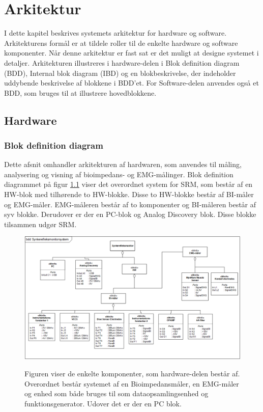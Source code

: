 \chapter{Arkitektur}

I dette kapitel beskrives systemets arkitektur for hardware og software. Arkitekturens formål er at tildele roller til de enkelte hardware og software komponenter. Når denne arkitektur er fast sat er det muligt at designe systemet i detaljer. Arkitekturen illustreres i hardware-delen i Blok definition diagram (BDD), Internal blok diagram (IBD) og en blokbeskrivelse, der indeholder uddybende beskrivelse af blokkene i BDD'et. For Software-delen anvendes også et BDD, som bruges til at illustrere hovedblokkene.

\section{Hardware}
\subsection{Blok definition diagram}

Dette afsnit omhandler arkitekturen af hardwaren, som anvendes til måling, analysering
og visning af bioimpedans- og EMG-målinger. Blok definition diagrammet på figur \ref{fig:arkitekturBDD} viser det overordnet system for SRM, som består af en HW-blok med tilhørende to HW-blokke. Disse to HW-blokke består af BI-måler og EMG-måler. EMG-måleren består af to komponenter og BI-måleren består af syv blokke. Derudover er der en PC-blok og Analog Discovery blok. Disse blokke tilsammen udgør SRM.

\begin{figure}[H] 
\centering
{\includegraphics[width=\linewidth]
{Figure/BDD}}
\caption{Figuren viser de enkelte komponenter, som hardware-delen består af. Overordnet består
systemet af en Bioimpedansmåler, en EMG-måler og enhed som både bruges til som
dataopsamlingsenhed og funktionsgenerator. Udover det er der en PC blok.}
\label{fig:arkitekturBDD}
\end{figure}




